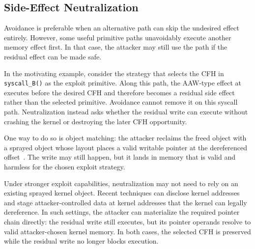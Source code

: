 
\subsection{Side-Effect Neutralization}
Avoidance is preferable when an alternative path can skip the undesired effect entirely. However, some useful primitive paths unavoidably execute another memory effect first. In that case, the attacker may still use the path if the residual effect can be made safe.


In the motivating example, consider the strategy that selects the CFH in \texttt{syscall\_B()} as the exploit primitive. Along this path, the AAW-type effect at  executes before the desired CFH and therefore becomes a residual side effect rather than the selected primitive. Avoidance cannot remove it on this syscall path. Neutralization instead asks whether the residual write can execute without crashing the kernel or destroying the later CFH opportunity.

One way to do so is object matching: the attacker reclaims the freed object with a sprayed object whose layout places a valid writable pointer at the dereferenced offset~\cite{SETTLERS66:online,Onedaysh20:online}. The write may still happen, but it lands in memory that is valid and harmless for the chosen exploit strategy.

Under stronger exploit capabilities, neutralization may not need to rely on an existing sprayed kernel object. Recent techniques can disclose kernel addresses and stage attacker-controlled data at kernel addresses that the kernel can legally dereference. In such settings, the attacker can materialize the required pointer chain directly: the residual write still executes, but its pointer operands resolve to valid attacker-chosen kernel memory. In both cases, the selected CFH is preserved while the residual write no longer blocks execution.











